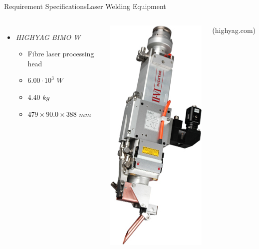 \begin{frame}{Requirement Specifications}{Laser Welding Equipment}
\begin{columns}
\begin{itemize}
    \item \textit{HIGHYAG BIMO W}
        \begin{itemize}
            \item Fibre laser processing head
            \item $6.00\cdot10^{3}$ $W$
            \item $4.40$ $kg$
            \item $479 \times 90.0 \times 388$ $mm$
        \end{itemize}   
\end{itemize}
\centering
\includegraphics[width=.65\textwidth]{graphics/andrej/bimo}

\tiny{(highyag.com)}
\end{columns}
\end{frame}

